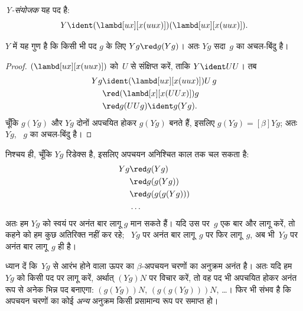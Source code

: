 \documentclass[../../../include/open-logic-section]{subfiles}
\begin{document}
\begin{defn}
  \emph{Y-संयोजक} यह पद है:
  \[
  Y \ident (\lambd[ux][x(uux)])(\lambd[ux][x(uux)]).
  \]
\end{defn}

\begin{thm}
  $Y$ में यह गुण है कि किसी भी पद $g$ के लिए $Yg \red g(Yg)$। अतः $Yg$
  सदा~$g$ का अचल-बिंदु है।
\end{thm}

\begin{proof}
  $(\lambd[ux][x(uux)])$ को~$U$ से संक्षिप्त करें, ताकि $Y \ident UU$। तब
  \begin{align*}
    Y g &\ident (\lambd[ux][x(uux)])U\,g \\
    &\red (\lambd[x][x(UUx)])g\\
    & \red g(UUg) \ident g(Yg).
  \end{align*}
  चूँकि $g(Yg)$ और $Yg$ दोनों अपचयित होकर $g(Yg)$ बनते हैं, इसलिए $g(Yg)
  \equal[\beta] Yg$; अतः $Yg$, ~$g$ का अचल-बिंदु है।
\end{proof}

निश्चय ही, चूँकि $Yg$ रिडेक्स है, इसलिए अपचयन अनिश्चित काल तक चल सकता है:
\begin{align*}
  Y g &\red g (Y g) \\
    &\red g (g (Y g)) \\
    &\red g(g (g (Y g)))\\
    &\ldots
\end{align*}
अतः हम $Yg$ को स्वयं पर अनंत बार लागू $g$ मान सकते हैं। यदि उस पर~$g$ एक
बार और लागू करें, तो कहने को हम कुछ अतिरिक्त नहीं कर रहे; ~$Yg$ पर अनंत
बार लागू~$g$ पर फिर लागू~$g$, अब भी~$Yg$ पर अनंत बार लागू~$g$ ही है।

ध्यान दें कि~$Yg$ से आरंभ होने वाला ऊपर का $\beta$-अपचयन चरणों का अनुक्रम
अनंत है। अतः यदि हम $Yg$ को किसी पद पर लागू करें, अर्थात् $(Yg)N$ पर विचार
करें, तो वह पद भी अपचयित होकर अनंत रूप से अनेक भिन्न पद बनाएगा:
$(g(Yg))N$, $(g(g(Yg)))N$, \dots। फिर भी संभव है कि अपचयन चरणों का कोई
\emph{अन्य} अनुक्रम किसी प्रसामान्य रूप पर समाप्त हो।
\end{document}

